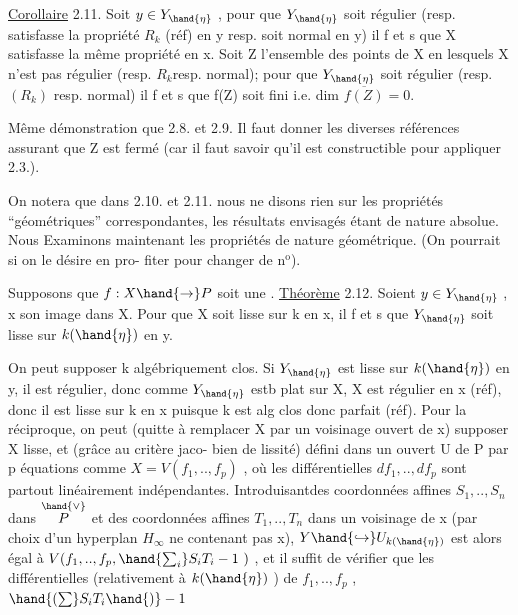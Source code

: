 
\uline{Corollaire} 2.11. Soit $y\in Y_{\hand{\eta}}$ , pour que $Y_{\hand{\eta}}$ soit régulier (resp. satisfasse la propriété
$R_k$ (réf) en y\hand{,} resp. soit normal en y) il f et s que X satisfasse
la même propriété en x.  Soit Z l'ensemble des points de X en
lesquels X n'est pas régulier (resp.  $R_k$resp.  normal); pour que $Y_{\hand{\eta}}$ soit
régulier (resp. $(R_k)$\hand{,} resp. normal) il f et s que f(Z) soit fini i.e. dim $\overline{f(Z)}=0$.

\placedmargin{|} Même démonstration que 2.8. et 2.9. Il faut donner les diverses
références assurant que Z est fermé (car il faut savoir qu'il est
constructible pour appliquer 2.3.).

 On notera que dans 2.10. et 2.11. nous ne disons rien
sur les propriétés ``géométriques'' correspondantes, les résultats
envisagés étant de nature absolue. Nous Examinons maintenant les
propriétés de nature géométrique. (On pourrait si on le désire en pro-%
\placedmargin{||}fiter pour changer de n$^{\text{o}}$).

Supposons que $f:X\hand{\to} P$ soit une .
\uline{Théorème} 2.12. Soient $y\in Y_{\hand{\eta}}$ , x son image dans X. Pour que X soit
lisse sur k en x, il f et s que $Y_{\hand{\eta}}$ soit lisse sur $k(\hand{\eta})$ en y.

On peut supposer k algébriquement clos. Si $Y_{\hand{\eta}}$ est lisse sur $k(\hand{\eta})$
en y, il est régulier, donc comme $Y_{\hand{\eta}}$ estb plat sur X, X est régulier
en x (réf), donc il est lisse sur k en x puisque k est alg clos donc
parfait (réf). Pour la réciproque, on peut (quitte à remplacer X par
un voisinage ouvert de x) supposer X lisse, et (grâce au critère jaco-%
bien de lissité) défini dans un ouvert U de P par p équations
comme $X=V(f_1,..,f_p)$ , où les différentielles $df_1,..,df_p$ sont
partout linéairement indépendantes. Introduisantdes coordonnées affines
$S_1,..,S_n$ dans $\overset{\hand{\vee}}{P}$ et des coordonnées affines $T_1,..,T_n$ dans un voisinage
de x (par choix d'un hyperplan $H_\infty$ ne contenant pas x), $Y\hand{\hookrightarrow} U_{k(\hand{\eta})}$ est
alors égal à $V(f_1,..,f_p,\hand{\sum_i}S_iT_i-1\ )$ , et il suffit de vérifier que
les différentielles (relativement à $k(\hand{\eta})$ ) de $f_1,..,f_p$ ,$\hand{(\sum}S_iT_i\hand{)}-1$

